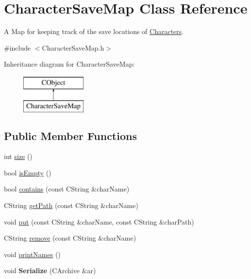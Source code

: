\hypertarget{class_character_save_map}{}\section{Character\+Save\+Map Class Reference}
\label{class_character_save_map}


A Map for keeping track of the save locations of \hyperlink{class_characters}{Characters}.  




{\ttfamily \#include $<$Character\+Save\+Map.\+h$>$}

Inheritance diagram for Character\+Save\+Map\+:\begin{figure}[H]
\begin{center}
\leavevmode
\includegraphics[height=2.000000cm]{class_character_save_map}
\end{center}
\end{figure}
\subsection*{Public Member Functions}
\begin{DoxyCompactItemize}
\item 
int \hyperlink{class_character_save_map_aa08505fbf7f84288fd9c21da0326bf49}{size} ()
\item 
bool \hyperlink{class_character_save_map_ab184ee82d93d3e907a582f1924f05990}{is\+Empty} ()
\item 
bool \hyperlink{class_character_save_map_ab139cd8a2bfb27da4a557689f32715b5}{contains} (const C\+String \&char\+Name)
\item 
C\+String \hyperlink{class_character_save_map_ae522be138bfeab45d12a255020150110}{get\+Path} (const C\+String \&char\+Name)
\item 
void \hyperlink{class_character_save_map_a1b0d8a748f717733e02ca01d2492fc80}{put} (const C\+String \&char\+Name, const C\+String \&char\+Path)
\item 
C\+String \hyperlink{class_character_save_map_a1daaac33e4d3550c29f6dd087d460209}{remove} (const C\+String \&char\+Name)
\item 
void \hyperlink{class_character_save_map_a4e62aa81be98017382c268a2e1165f09}{print\+Names} ()
\item 
\hypertarget{class_character_save_map_a8470b5c25754acc6eb4761bedaed55d8}{}\label{class_character_save_map_a8470b5c25754acc6eb4761bedaed55d8} 
void {\bfseries Serialize} (C\+Archive \&ar)
\end{DoxyCompactItemize}
